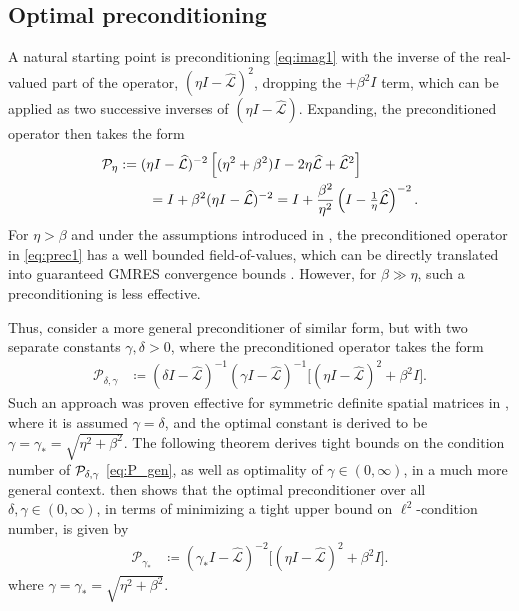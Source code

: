 \documentclass[review]{siamart}
\begin{document}
\subsection{Optimal preconditioning}\label{sec:solve:gamma}

A natural starting point is preconditioning \eqref{eq:imag1} with the inverse of
the real-valued part of the operator, $(\eta I - \widehat{\mathcal{L}})^2$,
dropping the $+ \beta^2 I$ term, which can be applied as two successive inverses
of $(\eta I - \widehat{\mathcal{L}})$. Expanding, the preconditioned operator
then takes the form
%
\begin{align}\nonumber
\mathcal{P}_\eta & := (\eta I - \widehat{\mathcal{L}})^{-2}
	\left[(\eta^2+\beta^2)I - 2\eta \widehat{\mathcal{L}} + \widehat{\mathcal{L}}^2\right]  \\
&\hspace{5ex} = I + \beta^2(\eta I - \widehat{\mathcal{L}})^{-2}
= I + \frac{\beta^2}{\eta^2}\left(I - \tfrac{1}{\eta}\widehat{\mathcal{L}}\right)^{-2}.\label{eq:prec1}
\end{align}
%
For $\eta > \beta$ and under the assumptions introduced in ,
the preconditioned operator in \eqref{eq:prec1} has a well bounded field-of-values,
which can be directly translated into guaranteed GMRES convergence bounds
\cite{liesen2012field}. However, for $\beta \gg \eta$, such a preconditioning
is less effective. 

Thus, consider a more general preconditioner of similar form, but with two separate
constants $\gamma,\delta > 0$, where the preconditioned operator takes the form
%
\begin{align}\label{eq:P_gen}
\mathcal{P}_{\delta,\gamma} & \coloneqq
	(\delta I - \widehat{\mathcal{L}})^{-1}(\gamma I - \widehat{\mathcal{L}})^{-1}
		\Big[(\eta I - \widehat{\mathcal{L}})^2 + \beta^2 I\Big].
\end{align}
%
Such an approach was proven effective for symmetric definite spatial matrices in
\cite{exh}, where it is assumed $\gamma = \delta$, and the optimal constant is
derived to be $\gamma = \gamma_* = \sqrt{\eta^2+\beta^2}$. The following
theorem derives tight bounds on the condition number of ${\cal P}_{\delta,\gamma}$ 
\eqref{eq:P_gen}, as well as optimality of $\gamma\in(0,\infty)$, in a much
more general context.   then shows that the optimal preconditioner 
over all $\delta,\gamma\in(0,\infty)$, in terms of minimizing a tight upper bound
on $\ell^2$-condition number, is given by 
%
\begin{align}\label{eq:P_gamma}
\mathcal{P}_{\gamma_*} & \coloneqq
	(\gamma_* I - \widehat{\mathcal{L}})^{-2}
		\Big[(\eta I - \widehat{\mathcal{L}})^2 + \beta^2 I\Big].
\end{align}
%
where $\gamma = \gamma_* = \sqrt{\eta^2+\beta^2}$.
\end{document}
